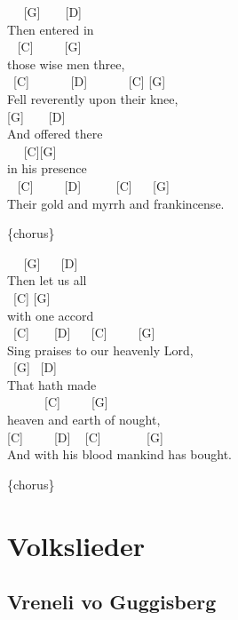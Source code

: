 \documentclass[
  letterpaper,
  twoside=false]{scrbook}
\begin{document}
~ ~{[}G{]} ~ ~ {[}D{]}\\
Then entered in\\
\hspace*{0.333em} ~ {[}C{]} ~ ~ ~{[}G{]}\\
those wise men three,\\
\hspace*{0.333em} ~{[}C{]} ~ ~ ~ ~{[}D{]} ~ ~ ~ ~{[}C{]} {[}G{]}\\
Fell reverently upon their knee,\\
\hspace*{0.333em} {[}G{]} ~ ~ {[}D{]}\\
And offered there\\
\hspace*{0.333em} ~ ~{[}C{]}{[}G{]}\\
in his presence\\
\hspace*{0.333em} ~ {[}C{]} ~ ~ ~{[}D{]} ~ ~ ~ {[}C{]} ~ ~{[}G{]}\\
Their gold and myrrh and frankincense.

\{chorus\}

~ ~{[}G{]} ~ ~{[}D{]}\\
Then let us all\\
\hspace*{0.333em} ~{[}C{]} {[}G{]}\\
with one accord ~\\
\hspace*{0.333em} ~{[}C{]} ~ ~ {[}D{]} ~ ~{[}C{]} ~ ~ ~{[}G{]}\\
Sing praises to our heavenly Lord,\\
\hspace*{0.333em} ~{[}G{]} ~{[}D{]}\\
That hath made\\
\hspace*{0.333em} ~ ~ ~ ~{[}C{]} ~ ~ ~{[}G{]}\\
heaven and earth of nought,\\
\hspace*{0.333em} {[}C{]} ~ ~ ~{[}D{]} ~ {[}C{]} ~ ~ ~ ~ {[}G{]}\\
And with his blood mankind has bought.

\{chorus\}

\part{Volkslieder}

\hypertarget{vreneli-vo-guggisberg}{%
\chapter{Vreneli vo Guggisberg}\label{vreneli-vo-guggisberg}}
\end{document}
